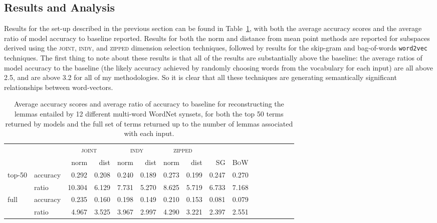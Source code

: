 \subsection{Results and Analysis}
Results for the set-up described in the previous section can be found in Table~\ref{tab:wordnet}, with both the average accuracy scores and the average ratio of model accuracy to baseline reported.  Results for both the norm and distance from mean point methods are reported for subspaces derived using the \textsc{joint}, \textsc{indy}, and \textsc{zipped} dimension selection techniques, followed by results for the skip-gram and bag-of-words \texttt{word2vec} techniques.  The first thing to note about these results is that all of the results are substantially above the baseline: the average ratios of model accuracy to the baseline (the likely accuracy achieved by randomly choosing words from the vocabulary for each input) are all above 2.5, and are above 3.2 for all of my methodologies.  So it is clear that all these techniques are generating semantically significant relationships between word-vectors.

\begin{table}
\centering
\begin{tabular}{llrrrrrrrrrrrr|rr}
\hline
&& \multicolumn{2}{c}{\textsc{joint}} & \multicolumn{2}{c}{\textsc{indy}} & \multicolumn{2}{c}{\textsc{zipped}} & \multicolumn{2}{c}{} \\
&& norm & dist & norm & dist & norm & \multicolumn{1}{r}{dist} & \textsc{SG} & \textsc{BoW} \\
\hline
\multirow{2}{*}{top-50} & accuracy & 0.292 & 0.208 & 0.240 & 0.189 & 0.273 & \multicolumn{1}{r|}{0.199} & 0.247 & 0.270 \\
& ratio & 10.304 & 6.129 & 7.731 & 5.270 & 8.625 & \multicolumn{1}{r|}{5.719} & 6.733 & 7.168 \\
\hline
\multirow{2}{*}{full} & accuracy & 0.235 & 0.160 & 0.198 & 0.149 & 0.210 & \multicolumn{1}{r|}{0.153} & 0.081 & 0.079 \\
& ratio & 4.967 & 3.525 & 3.967 & 2.997 & 4.290 & \multicolumn{1}{r|}{3.221} & 2.397 & 2.551 \\
\hline
\end{tabular}
\caption[Accuracy Scores for WordNet Recapitulation]{Average accuracy scores and average ratio of accuracy to baseline for reconstructing the lemmas entailed by 12 different multi-word WordNet synsets, for both the top 50 terms returned by models and the full set of terms returned up to the number of lemmas associated with each input.}
\label{tab:wordnet}
\end{table}

